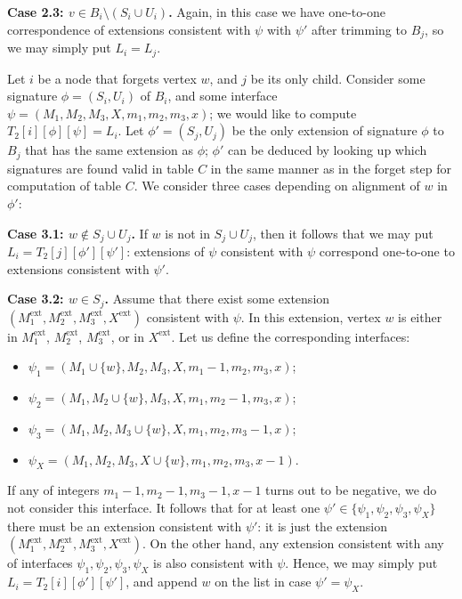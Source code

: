 \documentclass[a4paper,11pt]{article}
\theoremstyle{definition}
\theoremstyle{remark}
\newcommand{\ext}{\textrm{ext}}
\begin{document}
\vskip 0.1cm

{\bf{Case 2.3: $v\in B_i\setminus (S_i\cup U_i)$.}} Again, in this case we have
one-to-one correspondence of extensions consistent with $\psi$ with
$\psi'$ after trimming to $B_j$, so we may simply put $L_i=L_j$.

\vskip 0.3cm

 Let $i$ be a node that forgets
vertex $w$, and $j$ be its only child.  Consider some signature
$\phi=(S_i,U_i)$ of $B_i$, and some interface
$\psi=(M_1,M_2,M_3,X,m_1,m_2,m_3,x)$; we would like to compute
$T_2[i][\phi][\psi]=L_i$.  Let $\phi'=(S_j,U_j)$ be the only extension of 
signature $\phi$ to $B_j$ that has the same extension as
$\phi$; $\phi'$ can be deduced by looking up which signatures are
found valid in table $C$ in the same manner as in the forget step for
computation of table $C$.  We consider three cases depending on
alignment of $w$ in $\phi'$:

\vskip 0.1cm {\bf{Case 3.1: $w\notin S_j\cup U_j$.}} If $w$ is not in $S_j\cup
U_j$, then it follows that we may put $L_i=T_2[j][\phi'][\psi']$:
extensions of $\psi$ consistent with $\psi$ correspond one-to-one to
extensions consistent with $\psi'$.

\vskip 0.1cm {\bf{Case 3.2: $w\in S_j$.}} Assume that there exist some
extension $(M^{\ext}_1, M^{\ext}_2, M^{\ext}_3, X^{\ext})$ consistent
with $\psi$.  In this extension, vertex $w$ is either in $M^{\ext}_1$,
$M^{\ext}_2$, $M^{\ext}_3$, or in $X^{\ext}$.  Let us define the
corresponding interfaces:
\begin{itemize}
\item $\psi_1=(M_1\cup \{w\},M_2,M_3,X,m_1-1,m_2,m_3,x)$;
\item $\psi_2=(M_1,M_2\cup \{w\},M_3,X,m_1,m_2-1,m_3,x)$;
\item $\psi_3=(M_1,M_2,M_3\cup \{w\},X,m_1,m_2,m_3-1,x)$;
\item $\psi_X=(M_1,M_2,M_3,X\cup \{w\},m_1,m_2,m_3,x-1)$.
\end{itemize}
If any of integers $m_1-1,m_2-1,m_3-1,x-1$ turns out to be negative,
we do not consider this interface.  It follows that for at least one
$\psi'\in \{\psi_1,\psi_2,\psi_3,\psi_X\}$ there must be an extension
consistent with $\psi'$: it is just the extension $(M^{\ext}_1,
M^{\ext}_2, M^{\ext}_3, X^{\ext})$.  On the other hand, any extension
consistent with any of interfaces $\psi_1,\psi_2,\psi_3,\psi_X$ is
also consistent with $\psi$.  Hence, we may simply put
$L_i=T_2[i][\phi'][\psi']$, and append $w$ on the list in case
$\psi'=\psi_X$.
\end{document}
